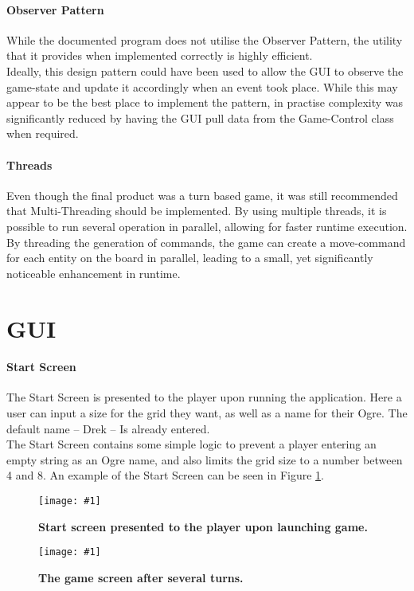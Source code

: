 \documentclass[conference]{acmsiggraph}
\newcommand{\figuremacroW}[4]{
	\begin{figure}[h] %
		\centering
		\texttt{[image: \#1]}
		\caption[#2]{\textbf{#2}  #3}
		\label{fig:#1}
	\end{figure}
}
\begin{document}
 		\paragraph{Observer Pattern}
			While the documented program does not utilise the Observer Pattern, the utility that it provides when implemented correctly is highly efficient.\\
		 	Ideally, this design pattern could have been used to allow the GUI to observe the game-state and update it accordingly when an event took place. While this may appear to be the best place to implement the pattern, in practise complexity was significantly reduced by having the GUI pull data from the Game-Control class when required.
		 	
 		\paragraph{Threads}
			Even though the final product was a turn based game, it was still recommended that Multi-Threading should be implemented. By using multiple threads, it is possible to run several operation in parallel, allowing for faster runtime execution.\\
			By threading the generation of commands, the game can create a move-command for each entity on the board in parallel, leading to a
			small, yet significantly noticeable enhancement in runtime.
			
			
	\section{GUI}
	
		\paragraph{Start Screen}
			The Start Screen is presented to the player upon running the application. Here a user can input a size for the grid they want, as well as a name for their Ogre. The default name – Drek – Is already entered.\\
			The Start Screen contains some simple logic to prevent a player entering an empty string as an Ogre name, and also limits the grid size to a number between 4 and 8. An example of the Start Screen can be seen in Figure \ref{fig:startScreen}.
					
		\figuremacroW
		{startScreen}
		{Start screen presented to the player upon launching game.}
		{}
		{0.75}
		
		\figuremacroW
		{gameScreen2}
		{The game screen after several turns.}
		{}
		{0.62}
		
\end{document}
